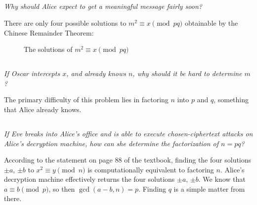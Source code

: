 \documentclass[12pt]{article}
\begin{document}
    \subsection{} \textit{Why should Alice expect to get a meaningful message fairly soon?}

        There are only four possible solutions to $m^2 \equiv x \pmod{pq}$ obtainable by the Chinese Remainder Theorem:

        \begin{figure}[H]
            \centering
            \caption{The solutions of $m^2 \equiv x \pmod{pq}$}
        \end{figure}

    \subsection{} \textit{If Oscar intercepts $x$, and already knows $n$, why should it be hard to determine $m$?}

        The primary difficulty of this problem lies in factoring $n$ into $p$ and $q$, something that Alice already knows.

    \subsection{} \textit{If Eve breaks into Alice's office and is able to execute chosen-ciphertext attacks on Alice's decryption machine, how can she determine the factorization of $n = pq$?}

    According to the statement on page 88 of the textbook, finding the four solutions $\pm a$, $\pm b$ to $x^2 \equiv y \pmod{n}$ is computationally equivalent to factoring $n$. Alice's decryption machine effectively returns the four solutions $\pm a$, $\pm b$. We know that $a \equiv b \pmod{p}$, so then $\gcd(a - b, n) = p$. Finding $q$ is a simple matter from there.
\end{document}
